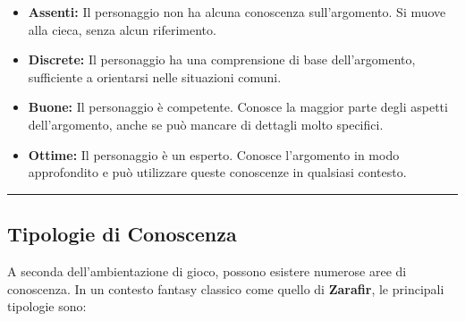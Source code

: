 \documentclass[../manuale_main.tex]{subfiles}
\begin{document}
\begin{itemize}
    \item \textbf{Assenti:} Il personaggio non ha alcuna conoscenza sull’argomento. Si muove alla cieca, senza alcun riferimento.
    
    \item \textbf{Discrete:} Il personaggio ha una comprensione di base dell’argomento, sufficiente a orientarsi nelle situazioni comuni.
    
    \item \textbf{Buone:} Il personaggio è competente. Conosce la maggior parte degli aspetti dell’argomento, anche se può mancare di dettagli molto specifici.
    
    \item \textbf{Ottime:} Il personaggio è un esperto. Conosce l’argomento in modo approfondito e può utilizzare queste conoscenze in qualsiasi contesto.
\end{itemize}

\vspace{0.5cm}
\rule{\textwidth}{0.4pt}
\vspace{0.5cm}

\subsection{Tipologie di Conoscenza}
A seconda dell’ambientazione di gioco, possono esistere numerose aree di conoscenza. In un contesto fantasy classico come quello di \textbf{Zarafir}, le principali tipologie sono:
\end{document}
